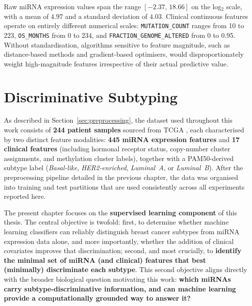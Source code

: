 Raw miRNA expression values span the range $[-2.37,\, 18.66]$ on the
log$_2$ scale, with a mean of $4.97$ and a standard deviation of $4.03$.
Clinical continuous features operate on entirely different numerical scales:
\texttt{MUTATION\_COUNT} ranges from 10 to 223, \texttt{OS\_MONTHS} from 0 to
234, and \texttt{FRACTION\_GENOME\_ALTERED} from 0 to 0.95. Without
standardisation, algorithms sensitive to feature magnitude, such as
distance-based methods and gradient-based optimisers, would disproportionately
weight high-magnitude features irrespective of their actual predictive value.


\FloatBarrier

\section{Discriminative Subtyping}
\label{sec:supervised}

As described in Section~\ref{sec:preprocessing}, the dataset used throughout this work
consists of \textbf{244 patient samples} sourced from TCGA \cite{TCGA_BRCA}, each characterised by two distinct
feature modalities: \textbf{445 miRNA expression features} and \textbf{17 clinical features}
(including hormonal receptor status, copy-number cluster assignments, and
methylation cluster labels), together with a PAM50-derived subtype label
(\textit{Basal-like}, \textit{HER2-enriched}, \textit{Luminal~A}, or \textit{Luminal~B}).
After the preprocessing pipeline detailed in the previous chapter, the data was 
organised into training and test partitions that are used 
consistently across all experiments reported here.

The present chapter focuses on the \textbf{supervised learning component} of this thesis.
The central objective is twofold: first, to determine whether machine learning classifiers
can reliably distinguish breast cancer subtypes from miRNA expression data alone, and more
importantly, whether the addition of clinical covariates improves that discrimination;
second, and most crucially, to \textbf{identify the minimal set of miRNA (and clinical)
features that best (minimally) discriminate each subtype}. This second objective aligns directly with
the broader biological question motivating this work: \textbf{which miRNAs carry subtype-discriminative
information, and can machine learning provide a computationally grounded way to answer it?}

